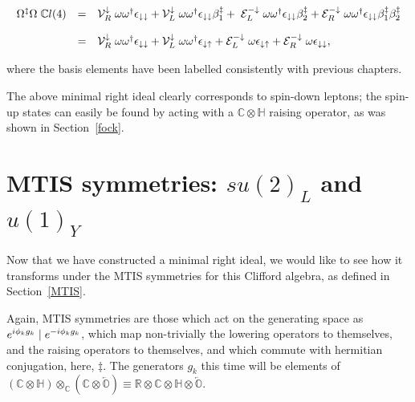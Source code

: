 \documentclass[letterpaper,12pt,titlepage,oneside,final]{book}
\newcommand{\C}{\mathbb{C}}
\newcommand{\CH}{\mathbb{C}\otimes\mathbb{H}}
\newcommand{\COOO}{\mathbb{C}\otimes\overleftarrow{\mathbb{O}}}
\newcommand{\RCHOOO}{\mathbb{R}\otimes\mathbb{C}\otimes\mathbb{H}\otimes\overleftarrow{\mathbb{O}}}
\newcommand{\CLfour}{\mathbb{C}l(4)}
\newcommand{\oot}{\omega \omega^{\dagger}}
\begin{document}
\begin{equation}\label{spin4_v2} \begin{array}{lll} 

\Omega^{\ddag}\Omega \hspace{1mm}\CLfour &=& \mathcal{V}_{R}^{\downarrow}\hspace{1mm} \oot\epsilon_{\downarrow\downarrow} + \mathcal{V}_{L}^{\downarrow} \hspace{1mm}\oot\epsilon_{\downarrow\downarrow} \beta_1^{\ddag}  +\hspace{1mm} \mathcal{E}_{L}^{-\downarrow}\hspace{1mm} \oot\epsilon_{\downarrow\downarrow} \beta_2^{\ddag} + \mathcal{E}_{R}^{-\downarrow}\hspace{1mm}\oot\epsilon_{\downarrow\downarrow} \beta_1^{\ddag}\beta_2^{\ddag}   \vspace{4mm} \\

&=&\mathcal{V}_{R}^{\downarrow}\hspace{1mm} \oot\epsilon_{\downarrow\downarrow}+ \mathcal{V}_{L}^{\downarrow} \hspace{1mm}\oot\epsilon_{\downarrow\uparrow} + \mathcal{E}_{L}^{-\downarrow}\hspace{1mm}\omega \epsilon_{\downarrow\uparrow} + \mathcal{E}_{R}^{-\downarrow}\hspace{1mm}\omega\epsilon_{\downarrow\downarrow},
\end{array}\end{equation}  

\noindent where the basis elements have been labelled consistently with previous chapters.  

The above minimal right ideal clearly corresponds to spin-down leptons;  the spin-up states can easily be found by acting with a $\CH$ raising operator, as was shown in Section~\ref{fock}.




\section{MTIS symmetries:  $su(2)_L$ and $u(1)_Y$   }

Now that we have constructed a minimal right ideal, we would like to see how it transforms under the MTIS symmetries for this Clifford algebra, as defined in Section~\ref{MTIS}.

Again, MTIS symmetries are those which act on the generating space as $e^{i\phi_kg_k}\hspace{1mm}|\hspace{1mm}e^{-i\phi_kg_k}$, which map non-trivially the lowering operators to themselves, and the raising operators to themselves, and which commute with hermitian conjugation, here, $\ddag$.  The generators $g_k$ this time will be elements of $(\CH)\otimes_{\C}(\COOO) \equiv \RCHOOO$.
\end{document}
